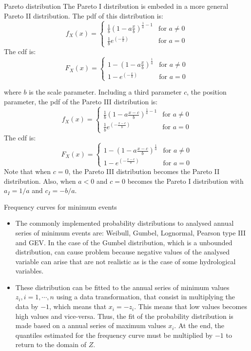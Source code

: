 \documentclass[8pt]{beamer}
\renewcommand{\emph}[1]{\textcolor{myorange}{#1}}
\begin{document}
\begin{frame}{Pareto distribution}
    The \emph{Pareto I distribution} is embeded in a more general \emph{Pareto II distribution}. The \emph{pdf} of this distribution is:
 \[
f_X (x) =
\begin{cases}
    \frac{1}{b} \left( 1- a\frac{x}{b} \right)^{\frac{1}{a} -1} & \text{for } a \neq 0  \\
    \frac{1}{b} e^{\left( -\frac{x}{b} \right)} & \text{for } a = 0 
\end{cases}
\]
The \emph{cdf} is:
 \[
F_X (x) =
\begin{cases}
    1- \left( 1- a\frac{x}{b} \right)^{\frac{1}{a}} & \text{for } a \neq 0  \\
    1- e^{\left( -\frac{x}{b} \right)} & \text{for } a = 0 
\end{cases}
\]

where $b$ is the scale parameter. 
Including a third parameter $c$, the position parameter, the \emph{pdf} of the \emph{Pareto III distribution} is:
 \[
f_X (x) =
\begin{cases}
    \frac{1}{b} \left( 1- a\frac{x-c}{b} \right)^{\frac{1}{a} -1} & \text{for } a \neq 0  \\
    \frac{1}{b} e^{\left( -\frac{x-c}{b} \right)} & \text{for } a = 0 
\end{cases}
\]
The \emph{cdf} is:
 \[
F_X (x) =
\begin{cases}
    1- \left( 1- a\frac{x-c}{b} \right)^{\frac{1}{a}} & \text{for } a \neq 0  \\
    1- e^{\left( -\frac{x-c}{b} \right)} & \text{for } a = 0 
\end{cases}
\]
Note that when $c=0$, the \emph{Pareto III distribution} becomes the \emph{Pareto II distribution}. Also, when $a< 0$ and $c=0$ becomes the \emph{Pareto I distribution} with $a_I = 1/a$ and $c_I = -b/a $. 

\end{frame}

\begin{frame}{Frequency curves for minimum events}
    \begin{itemize}
        \item The commonly implemented probability distributions to analysed annual series of minimum events are: \emph{Weibull}, \emph{Gumbel}, \emph{Lognormal}, \emph{Pearson type III} and \emph{GEV}. In the case of the \emph{Gumbel distribution}, which is a unbounded distribution, can cause problem because negative values of the analysed variable can arise that are not realistic as is the case of some hydrological variables.
        \item These distribution can be fitted to the annual series of minimum values ${z_i, i=1, \cdots, n}$ using a data transformation, that consist in multiplying the data by $-1$, which means that $x_i = -z_i$. This means that  low values becomes high values and vice-versa. Thus, the fit of the probability distribution is made based on a annual series of maximum values $x_i$. At the end, the quantiles estimated for the frequency curve must be multiplied by $-1$ to return to the domain of $Z$. 
    \end{itemize}
\end{frame}
\end{document}
